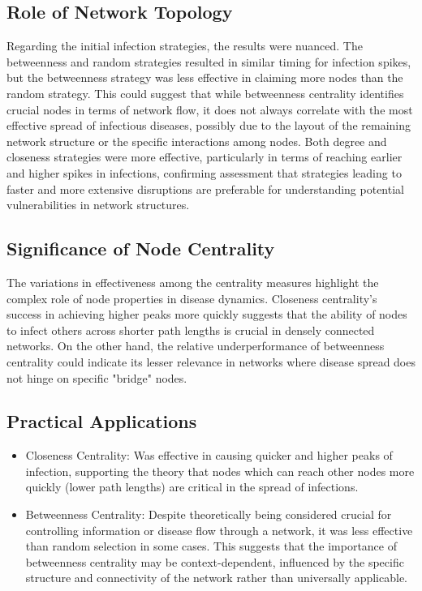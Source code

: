 \documentclass[
	report, %
	11pt, %
]{CSUniSchoolLabReport}
\newcounter{ct}
\begin{document}
\subsection{Role of Network Topology}
Regarding the initial infection strategies, the results were nuanced. The betweenness and random strategies resulted in similar timing for infection spikes, but the betweenness strategy was less effective in claiming more nodes than the random strategy. This could suggest that while betweenness centrality identifies crucial nodes in terms of network flow, it does not always correlate with the most effective spread of infectious diseases, possibly due to the layout of the remaining network structure or the specific interactions among nodes. Both degree and closeness strategies were more effective, particularly in terms of reaching earlier and higher spikes in infections, confirming assessment that strategies leading to faster and more extensive disruptions are preferable for understanding potential vulnerabilities in network structures.

\subsection{Significance of Node Centrality}
The variations in effectiveness among the centrality measures highlight the complex role of node properties in disease dynamics. Closeness centrality's success in achieving higher peaks more quickly suggests that the ability of nodes to infect others across shorter path lengths is crucial in densely connected networks. On the other hand, the relative underperformance of betweenness centrality could indicate its lesser relevance in networks where disease spread does not hinge on specific "bridge" nodes.


\subsection{Practical Applications}
\begin{itemize}
	\item	Closeness Centrality: Was effective in causing quicker and higher peaks of infection, supporting the theory that nodes which can reach other nodes more quickly (lower path lengths) are critical in the spread of infections.
	\item	Betweenness Centrality: Despite theoretically being considered crucial for controlling information or disease flow through a network, it was less effective than random selection in some cases. This suggests that the importance of betweenness centrality may be context-dependent, influenced by the specific structure and connectivity of the network rather than universally applicable.
\end{itemize}
\end{document}
